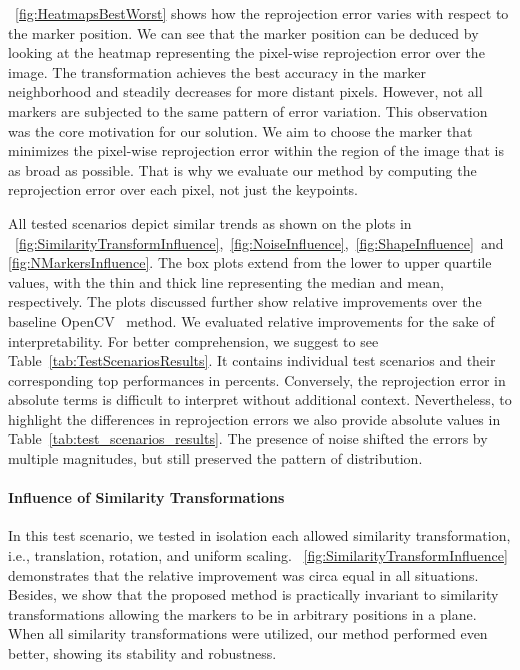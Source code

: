 \figstr{}~\ref{fig:HeatmapsBestWorst} shows how the reprojection error varies with respect to the marker position. We can see that the marker position can be deduced by looking at the heatmap representing the pixel-wise reprojection error over the image. The transformation achieves the best accuracy in the marker neighborhood and steadily decreases for more distant pixels. However, not all markers are subjected to the same pattern of error variation. This observation was the core motivation for our solution. We aim to choose the marker that minimizes the pixel-wise reprojection error within the region of the image that is as broad as possible. That is why we evaluate our method by computing the reprojection error over each pixel, not just the keypoints.

All tested scenarios depict similar trends as shown on the plots in \figstr{}~\ref{fig:SimilarityTransformInfluence},~\ref{fig:NoiseInfluence},~\ref{fig:ShapeInfluence}~and~\ref{fig:NMarkersInfluence}. The box plots extend from the lower to upper quartile values, with the thin and thick line representing the median and mean, respectively. The plots discussed further show relative improvements over the baseline OpenCV~\cite{bradski2008learning} method. We evaluated relative improvements for the sake of interpretability. For better comprehension, we suggest to see Table~\ref{tab:TestScenariosResults}. It contains individual test scenarios and their corresponding top performances in percents. Conversely, the reprojection error in absolute terms is difficult to interpret without additional context. Nevertheless, to highlight the differences in reprojection errors we also provide absolute values in Table~\ref{tab:test_scenarios_results}. The presence of noise shifted the errors by multiple magnitudes, but still preserved the pattern of distribution.

\paragraph{Influence of Similarity Transformations}
In this test scenario, we tested in isolation each allowed similarity transformation, i.e., translation, rotation, and uniform scaling. \figstr{}~\ref{fig:SimilarityTransformInfluence} demonstrates that the relative improvement was circa equal in all situations. Besides, we show that the proposed method is practically invariant to similarity transformations allowing the markers to be in arbitrary positions in a plane. When all similarity transformations were utilized, our method performed even better, showing its stability and robustness.

